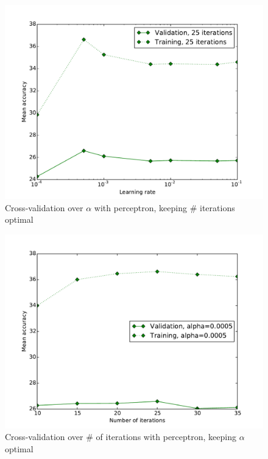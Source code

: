 \documentclass{acm_proc_article-sp}
\begin{document}
\begin{figure}[h!]
	\centering
	\includegraphics[width=\linewidth]{perceptron_learningrate}
  	\caption{Cross-validation over $\alpha$ with perceptron, keeping \# iterations optimal}
  	\label{fig:perc-learningrate}
\end{figure}
\begin{figure}[h!]
	\centering
	\includegraphics[width=\linewidth]{perceptron_iterations}
  	\caption{Cross-validation over \# of iterations with perceptron, keeping $\alpha$ optimal}
  	\label{fig:perc-iterations}
\end{figure}


\balancecolumns
\end{document}
